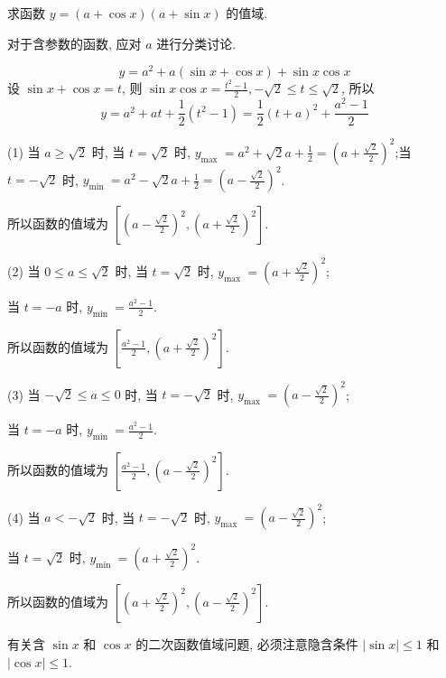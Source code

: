 \begin{example}
	求函数 $y=(a+\cos x)(a+\sin x)$ 的值域.
\end{example}
\begin{analysis}
	对于含参数的函数, 应对 $a$ 进行分类讨论.
\end{analysis}
\begin{solution}
	$$
		y=a^{2}+a(\sin x+\cos x)+\sin x \cos x
	$$
	设 $\sin x+\cos x=t$, 则 $\sin x \cos x=\frac{t^{2}-1}{2},-\sqrt{2} \leqslant t \leqslant \sqrt{2}$, 所以
	$$
		y=a^{2}+a t+\frac{1}{2}\left(t^{2}-1\right)=\frac{1}{2}(t+a)^{2}+\frac{a^{2}-1}{2}
	$$

	(1) 当 $a \geqslant \sqrt{2}$ 时, 当 $t=\sqrt{2}$ 时, $y_{\text {max }}=a^{2}+\sqrt{2} a+\frac{1}{2}=\left(a+\frac{\sqrt{2}}{2}\right)^{2}$;当 $t=-\sqrt{2}$ 时, $y_{\text {min }}=a^{2}-\sqrt{2} a+\frac{1}{2}=\left(a-\frac{\sqrt{2}}{2}\right)^{2}$.

	所以函数的值域为 $\left[\left(a-\frac{\sqrt{2}}{2}\right)^{2},\left(a+\frac{\sqrt{2}}{2}\right)^{2}\right]$.

	(2) 当 $0 \leqslant a \leqslant \sqrt{2}$ 时, 当 $t=\sqrt{2}$ 时, $y_{\text {max }}=\left(a+\frac{\sqrt{2}}{2}\right)^{2}$;

	当 $t=-a$ 时, $y_{\text {min }}=\frac{a^{2}-1}{2}$.

	所以函数的值域为 $\left[\frac{a^{2}-1}{2},\left(a+\frac{\sqrt{2}}{2}\right)^{2}\right]$.

	(3) 当 $-\sqrt{2} \leqslant a \leqslant 0$ 时, 当 $t=-\sqrt{2}$ 时, $y_{\text {max }}=\left(a-\frac{\sqrt{2}}{2}\right)^{2}$;

	当 $t=-a$ 时, $y_{\text {min }}=\frac{a^{2}-1}{2}$.

	所以函数的值域为 $\left[\frac{a^{2}-1}{2},\left(a-\frac{\sqrt{2}}{2}\right)^{2}\right]$.

	(4) 当 $a<-\sqrt{2}$ 时, 当 $t=-\sqrt{2}$ 时, $y_{\text {max }}=\left(a-\frac{\sqrt{2}}{2}\right)^{2}$;

	当 $t=\sqrt{2}$ 时, $y_{\text {min }}=\left(a+\frac{\sqrt{2}}{2}\right)^{2}$.

	所以函数的值域为 $\left[\left(a+\frac{\sqrt{2}}{2}\right)^{2},\left(a-\frac{\sqrt{2}}{2}\right)^{2}\right]$.
\end{solution}
\begin{note}
	有关含 $\sin x$ 和 $\cos x$ 的二次函数值域问题, 必须注意隐含条件 $|\sin x| \leqslant 1$ 和 $|\cos x| \leqslant 1$.
\end{note}

